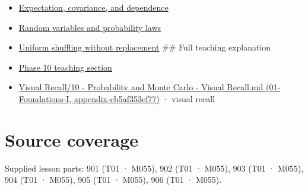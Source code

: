 \begin{itemize}
\item
  \hyperref[appendix-54c383df9992]{Expectation, covariance, and dependence}
\item
  \hyperref[appendix-4d0203f7944f]{Random variables and probability laws}
\item
  \hyperref[appendix-184fcc411663]{Uniform shuffling without replacement} \#\# Full teaching explanation
\item
  \href{Continuous\%20Notes/Computing\%20Foundations\%20-\%20From\%20Bits\%20to\%20C++\%20and\%20Systems\%20APIs\#1.\%20A\%20probability\%20model\%20begins\%20with\%20possible\%20outcomes}{Phase 10 teaching section}
\item
  \href{../01-Foundations-I/main.pdf\#nameddest=appendix-cb5af353ef77}{Visual Recall/10 - Probability and Monte Carlo - Visual Recall.md (01-Foundations-I, appendix-cb5af353ef77)} · visual recall
\end{itemize}

\section{Source coverage}\label{appendix-f1ef323f6ed7-source-coverage}

Supplied lesson parts: 901 (T01 · M055), 902 (T01 · M055), 903 (T01 · M055), 904 (T01 · M055), 905 (T01 · M055), 906 (T01 · M055).
